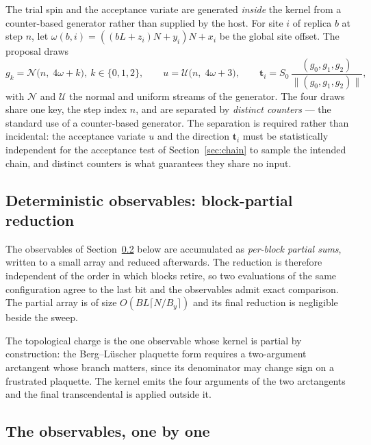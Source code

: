 \documentclass[11pt,a4paper]{article}
\newcommand{\vt}{\mathbf{t}}
\begin{document}
The trial spin and the acceptance variate are generated \emph{inside} the kernel
from a counter-based generator rather than supplied by the host. For site $i$ of
replica $b$ at step $n$, let $\omega(b, i) = ((b L + z_i) N + y_i) N + x_i$ be
the global site offset. The proposal draws
%
\begin{equation}
g_k = \mathcal{N}\!\bigl(n,\; 4\omega + k\bigr),\ k \in \{0,1,2\},
\qquad
u = \mathcal{U}\!\bigl(n, \; 4\omega + 3\bigr),
\qquad
\vt_i = S_0\, \frac{(g_0, g_1, g_2)}{\lVert (g_0,g_1,g_2) \rVert},
\label{eq:rng}
\end{equation}
%
with $\mathcal{N}$ and $\mathcal{U}$ the normal and uniform streams of the
generator. The four draws share one key, the step index $n$, and are separated
by \emph{distinct counters} --- the standard use of a counter-based generator.
The separation is required rather than incidental: the acceptance variate $u$
and the direction $\vt_i$ must be statistically independent for the acceptance
test of Section~\ref{sec:chain} to sample the intended chain, and distinct
counters is what guarantees they share no input.

\subsection{Deterministic observables: block-partial reduction}
\label{sec:reduction}

The observables of Section~\ref{sec:observables} below are accumulated as
\emph{per-block partial sums}, written to a small array and reduced afterwards.
The reduction is therefore independent of the order in which blocks retire, so
two evaluations of the same configuration agree to the last bit and the
observables admit exact comparison. The partial array is of size
$O(B L \lceil N/B_y \rceil)$ and its final reduction is negligible beside the
sweep.

The topological charge is the one observable whose kernel is partial by
construction: the Berg--L\"uscher plaquette form requires a two-argument
arctangent whose branch matters, since its denominator may change sign on a
frustrated plaquette. The kernel emits the four arguments of the two arctangents
and the final transcendental is applied outside it.

\subsection{The observables, one by one}
\label{sec:observables}
\end{document}
